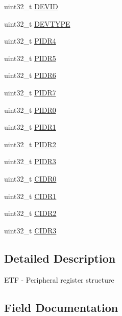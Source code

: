 \begin{DoxyCompactItemize}
\item 
uint32\+\_\+t \hyperlink{struct_e_t_f___mem_map_aee80b184feed55cdc9d611672417d6e6}{D\+E\+V\+I\+D}
\item 
uint32\+\_\+t \hyperlink{struct_e_t_f___mem_map_a6bc4c22708e71bde72f0c04236c471c5}{D\+E\+V\+T\+Y\+P\+E}
\item 
uint32\+\_\+t \hyperlink{struct_e_t_f___mem_map_a955a81d9c5e73e129ca965fa226bfde8}{P\+I\+D\+R4}
\item 
uint32\+\_\+t \hyperlink{struct_e_t_f___mem_map_a3054ae260a217f950e2c7793ff27855d}{P\+I\+D\+R5}
\item 
uint32\+\_\+t \hyperlink{struct_e_t_f___mem_map_a3448111767c72273ead546c08f49047b}{P\+I\+D\+R6}
\item 
uint32\+\_\+t \hyperlink{struct_e_t_f___mem_map_a53393d8ce48a43bed1d5568561776a5c}{P\+I\+D\+R7}
\item 
uint32\+\_\+t \hyperlink{struct_e_t_f___mem_map_a0ed9ad5240882ee853a4f4e8871c145f}{P\+I\+D\+R0}
\item 
uint32\+\_\+t \hyperlink{struct_e_t_f___mem_map_a70c724eb6523bbe1eedd98c71922cf65}{P\+I\+D\+R1}
\item 
uint32\+\_\+t \hyperlink{struct_e_t_f___mem_map_a4b3e618b1219f136bfd2e2846b1c1b1c}{P\+I\+D\+R2}
\item 
uint32\+\_\+t \hyperlink{struct_e_t_f___mem_map_a1132bf279f207a39e89f2fab3d384308}{P\+I\+D\+R3}
\item 
uint32\+\_\+t \hyperlink{struct_e_t_f___mem_map_aa11e0d070ab0917209b9dbd000f0dd3f}{C\+I\+D\+R0}
\item 
uint32\+\_\+t \hyperlink{struct_e_t_f___mem_map_af7c4231d402d34bc78649e996d0595a5}{C\+I\+D\+R1}
\item 
uint32\+\_\+t \hyperlink{struct_e_t_f___mem_map_aa4497a28e03196ee5a3d4c6cf8a7892f}{C\+I\+D\+R2}
\item 
uint32\+\_\+t \hyperlink{struct_e_t_f___mem_map_a8ff6c84678887a89964218abe295b05f}{C\+I\+D\+R3}
\end{DoxyCompactItemize}


\subsection{Detailed Description}
E\+T\+F -\/ Peripheral register structure 

\subsection{Field Documentation}
\hypertarget{struct_e_t_f___mem_map_ae403364ae54b1eb918a559349465a7a8}{}
